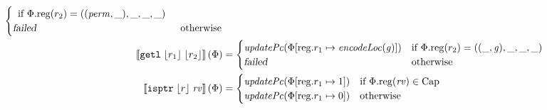 \documentclass[a4paper]{article}
\newcommand{\update}[2]{[#1 \mapsto #2]}
\newcommand{\sem}[1]{\left\llbracket #1 \right\rrbracket}
\newcommand\lau[1]{{\color{purple} \sf \footnotesize {LS: #1}}\\}
\newcommand\dominique[1]{{\color{purple} \sf \footnotesize {DD: #1}}\\}
\renewcommand\lau[1]{}
\renewcommand\dominique[1]{}
\newcommand{\var}[1]{\mathit{#1}}
\newcommand{\rv}{\var{rv}}
\newcommand{\gl}{\var{g}}
\newcommand{\perm}{\var{perm}}
\newcommand{\plainproj}[1]{\mathrm{#1}}
\newcommand{\memreg}[1][\Phi]{#1.\plainproj{reg}}
\newcommand{\updateReg}[3][\Phi]{#1\update{\plainproj{reg}.#2}{#3}}
\newcommand{\failed}{\textsl{failed}}
\newcommand{\plainfun}[2]{
  \ifthenelse{\equal{#2}{}}
  {\mathit{#1}}
  {\mathit{#1}(#2)}
}
\newcommand{\encodeLoc}{\mathit{encodeLoc}{}}
\newcommand{\writeAllowed}[1]{\plainfun{writeAllowed}{#1}}
\newcommand{\stdUpdatePc}[1]{\plainfun{updatePc}{#1}}
\newcommand{\plaindom}[1]{\mathrm{#1}}
\newcommand{\Caps}{\plaindom{Cap}}
\newcommand{\refreg}[1]{\lfloor #1 \rfloor}
\newcommand{\zinstr}[1]{\mathtt{#1}}
\newcommand{\twoinstr}[3]{\zinstr{#1} \; #2 \; #3}
\newcommand{\isptr}[2]{\twoinstr{isptr}{#1}{#2}}
\newcommand{\getl}[2]{\twoinstr{getl}{#1}{#2}}
\begin{document}
\begin{align*}
\begin{cases}
\begin{array}[t]{l}
                                                \text{if $\memreg(r_2) = ((\perm,\_),\_,\_,\_)$}
                                              \end{array} \\
                                              \failed & \text{otherwise}
                                            \end{cases}
  \\
  \sem{\getl{\refreg{r_1}}{\refreg{r_2}}}(\Phi) & = 
                                            \begin{cases}
                                              \stdUpdatePc{\updateReg{r_1}{\encodeLoc(\gl)}} &
                                              \arraycolsep=0pt
                                              \begin{array}[t]{l}
                                                \text{if $\memreg(r_2) = ((\_,\gl),\_,\_,\_)$}
                                              \end{array} \\
                                              \failed & \text{otherwise}
                                            \end{cases}
  \\
  \sem{\isptr{\refreg{r}}{\rv}}(\Phi) & =  
                                  \begin{cases}
                                    \stdUpdatePc{\updateReg{r_1}{1}} & \text{if $\memreg(\rv) \in \Caps$ } \\
                                    \stdUpdatePc{\updateReg{r_1}{0}} & \text{otherwise} 
                                  \end{cases}
\end{align*}
\lau{Our instruction set could use a less than operator.}
\lau{Dominique, apparently there was a reason I had not added the new condition in store to $\writeAllowed{}$. The new condition depends on a case distinction on $w$. It is only if $w$ is a capability that we look into whether it is local or not. But even if $w$ is just an integer, we still need the capability we write through to have some kind of write permission.}
\dominique{I see, but maybe writeAllowed could take $w$ and $c$ as an argument, ratheppppr than just $\perm$? It is now weird that some conditions for writing are in $\writeAllowed{}$, but not all.}

\dominique{factor out reoccurring conditions of the form $n_i = \rv_i$ or $n_i =
  \memreg(\rv_i)$ into a function that evaluates an $\rv$ using a system state?
  This would generalise nicely to the case where we would have additional
  addressing modes.}
\end{document}
